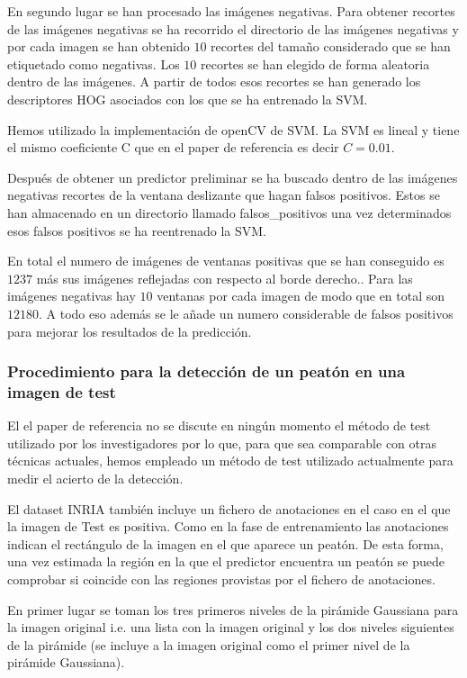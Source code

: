 \documentclass[a4paper,12pt]{article}
\begin{document}
En segundo lugar se han procesado las imágenes negativas. Para
obtener recortes de las imágenes negativas se ha recorrido el
directorio de las imágenes negativas y por cada imagen se han
obtenido $10$ recortes del tamaño considerado que se han etiquetado
como negativas. Los $10$ recortes se han elegido de forma aleatoria
dentro de las imágenes. A partir de todos esos recortes se han generado
los descriptores HOG asociados con los que se ha entrenado la SVM.

Hemos utilizado la implementación de openCV de SVM. La SVM es
lineal y tiene el mismo coeficiente C que en el paper de referencia
es decir $C = 0.01$.

Después de obtener un predictor preliminar se ha buscado dentro de las
imágenes negativas recortes de la ventana deslizante que hagan falsos
positivos. Estos se han almacenado en un directorio llamado falsos\_positivos
una vez determinados esos falsos positivos se ha reentrenado la SVM.

En total el numero de imágenes de ventanas positivas que se han
conseguido es $1237$ más sus imágenes reflejadas con respecto al borde derecho.. Para las imágenes negativas hay $10$ ventanas por
cada imagen de modo que en total son $12180$. A todo eso además se le añade
un numero considerable de falsos positivos para mejorar los resultados
de la predicción.

\subsubsection{Procedimiento para la detección de un peatón en una imagen de test}

El el paper de referencia no se discute en ningún momento el método de test utilizado por los investigadores por lo que, para que sea comparable con otras técnicas actuales, hemos empleado un método de test utilizado actualmente para medir el acierto de la detección.



El dataset INRIA también incluye un fichero de anotaciones en el caso en el que la imagen de Test es positiva. Como en la fase de entrenamiento las anotaciones indican el rectángulo de la imagen en el que aparece un peatón. De esta forma, una vez estimada la región en la que el predictor encuentra un peatón se puede comprobar si coincide con las regiones provistas por el fichero de anotaciones. 

En primer lugar se toman los tres primeros niveles de la pirámide Gaussiana para la imagen original i.e. una lista con la imagen original y los dos niveles siguientes de la pirámide (se incluye a la imagen original como el primer nivel de la pirámide Gaussiana).
\end{document}
